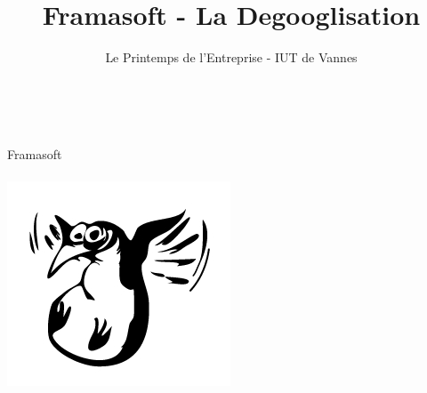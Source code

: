 \documentclass{beamer}
\title[Framasoft]{Framasoft - La Degooglisation}
\author{Le Printemps de l'Entreprise - IUT de Vannes}
\begin{document}
\begin{frame}
	\titlepage
	\vfill
	\begin{center}
		\\[2.5ex]
		{\tiny\CcNote{\CcLongnameByNcSa}}
		\vspace*{-2.5ex}
	\end{center}
\end{frame}


\begin{frame}
\begin{center}
\Huge{Framasoft}
\\~\\
\includegraphics[scale=0.6]{./images/pingouinVolantRefait.jpg}
\end{center}
\end{frame}
\end{document}
